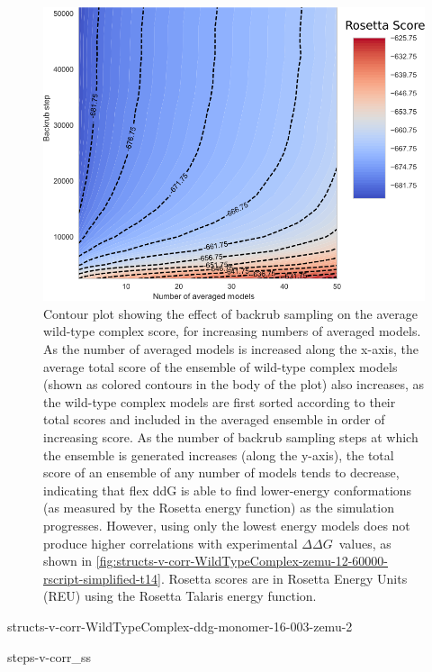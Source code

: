 \documentclass[journal=jpcbfk,manuscript=suppinfo]{achemso}
\newcommand\ddg{$\Delta\Delta G$}
\begin{document}
\begin{figure}
  \centering
  \includegraphics[width=\textwidth,keepaspectratio]{figures/wildtypecomplex-scores-complete.png}
  \caption{
    Contour plot showing the effect of backrub sampling on the average wild-type complex score, for increasing numbers of averaged models. As the number of averaged models is increased along the x-axis, the average total score of the ensemble of wild-type complex models (shown as colored contours in the body of the plot) also increases, as the wild-type complex models are first sorted according to their total scores and included in the averaged ensemble in order of increasing score.
    As the number of backrub sampling steps at which the ensemble is generated increases (along the y-axis), the total score of an ensemble of any number of models tends to decrease, indicating that flex ddG is able to find lower-energy conformations (as measured by the Rosetta energy function) as the simulation progresses. However, using only the lowest energy models does not produce higher correlations with experimental \ddg\ values, as shown in \cref{fig:structs-v-corr-WildTypeComplex-zemu-12-60000-rscript-simplified-t14}.
    Rosetta scores are in Rosetta Energy Units (REU) using the Rosetta Talaris energy function\cite{song_structure-guided_2011,shapovalov_smoothed_2011,omeara_combined_2015}.
  } \label{fig:wildtypecomplex-scores-complete}
\end{figure}

{structs-v-corr-WildTypeComplex-ddg-monomer-16-003-zemu-2}

\clearpage
  {\small
    {steps-v-corr_ss}
  }
\clearpage
\end{document}
